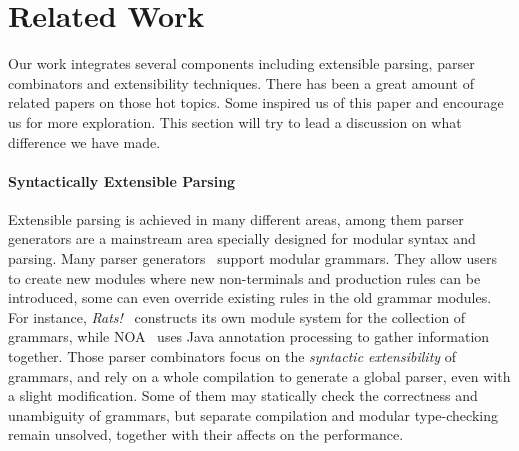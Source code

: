 \section{Related Work}\label{sec:relatedwork}

%
%
%
%

Our work integrates several components including extensible parsing,
parser combinators and extensibility techniques. There has been a
great amount of related papers on those hot topics. Some
inspired us of this paper and encourage us for more exploration. This
section will try to lead a discussion on what difference we have made.

\paragraph{Syntactically Extensible Parsing} Extensible parsing is achieved in many
different areas, among them parser generators are a mainstream area
specially designed for modular syntax and parsing. Many parser
generators~\cite{antlr1995,Grimm2006,Gouseti2014,Warth2016} support
modular grammars. They allow users to create new
modules where new non-terminals and production rules can be
introduced, some can even override existing rules in the old grammar
modules. For instance, \textit{Rats!}~\cite{Grimm2006} constructs its
own module system for the collection of grammars, while
NOA~\cite{Gouseti2014} uses Java annotation processing to gather
information together. Those parser combinators focus on the
\textit{syntactic extensibility} of grammars, and rely on a whole
compilation to generate a global parser, even with a slight
modification. Some of them may statically check the correctness and
unambiguity of grammars, but separate compilation and modular
type-checking remain unsolved, together with their affects on the performance.

